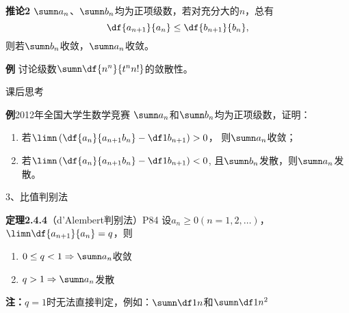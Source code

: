 \begin{frame}
	\linespread{1.2}\pause
	\begin{block}{{\bf 推论2}}
		$\sumn a_n$、$\sumn b_n$均为正项级数，若对充分大的$n$，总有
		$$\df{a_{n+1}}{a_n}\leq\df{b_{n+1}}{b_n},$$
		则若$\sumn b_n$收敛，$\sumn a_n$收敛。\pause
	\end{block}
	\begin{exampleblock}{{\bf 例}}
		讨论级数$\sumn\df{n^n}{t^nn!}$的敛散性。
	\end{exampleblock}
\end{frame}

\begin{frame}{课后思考}
	\linespread{1.2}
	\begin{exampleblock}{{\bf 例}\hfill 2012年全国大学生数学竞赛}
		$\sumn a_n$和$\sumn b_n$均为正项级数，证明：
		\begin{enumerate}
		  \item 若$\limn\left(\df{a_n}{a_{n+1}b_n}-\df 1{b_{n+1}}\right)>0$，
		  则$\sumn a_n$收敛；
		  \item 若$\limn\left(\df{a_n}{a_{n+1}b_n}-\df 1{b_{n+1}}\right)<0$,
		  且$\sumn b_n$发散，则$\sumn a_n$发散。
		\end{enumerate}
	\end{exampleblock}
\end{frame}

\begin{frame}{3、比值判别法}
	\linespread{1.5}\pause 
	\begin{block}{{\bf 定理2.4.4}（d'Alembert判别法）\hfill P84}\pause 
		设$a_n\geq 0(n=1,2,\ldots)$，$\limn\df{a_{n+1}}{a_n}=q$，则\pause 
		\begin{enumerate}
		  \item $0\leq q<1\Rightarrow\sumn a_n$收敛\pause 
		  \item $q>1\Rightarrow\sumn a_n$发散
		\end{enumerate}
	\end{block}\pause
	\bigskip 
	\alert{\bf 注：}$q=1$时无法直接判定，\pause 例如：$\sumn\df 1n$和$\sumn\df 1{n^2}$
\end{frame}

